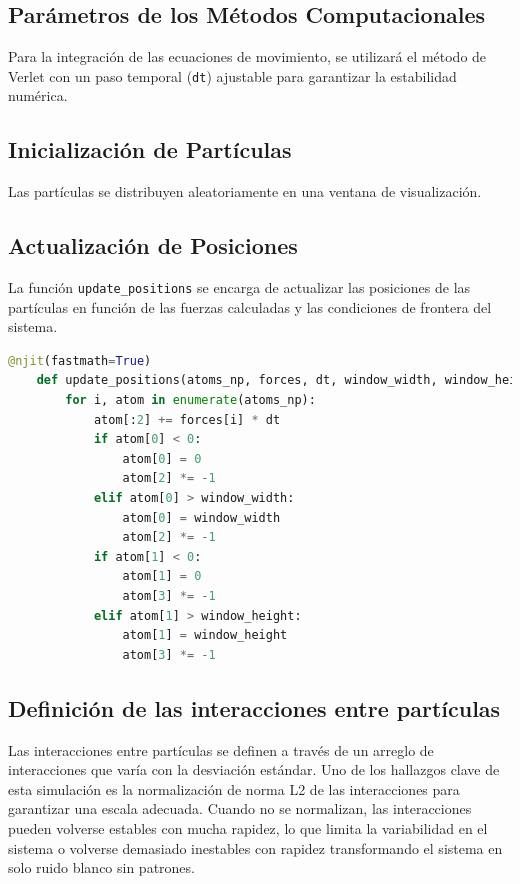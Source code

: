 \begin{itemize}
\subsection{Parámetros de los Métodos Computacionales}
Para la integración de las ecuaciones de movimiento, se utilizará el método de Verlet con un paso temporal (\texttt{dt}) ajustable para garantizar la estabilidad numérica.

\subsection{Inicialización de Partículas}
Las partículas se distribuyen aleatoriamente en una ventana de visualización.

\subsection{Actualización de Posiciones}
La función \texttt{update_positions} se encarga de actualizar las posiciones de las partículas en función de las fuerzas calculadas y las condiciones de frontera del sistema.

\begin{lstlisting}[language=Python]
    @njit(fastmath=True)
    def update_positions(atoms_np, forces, dt, window_width, window_height):
        for i, atom in enumerate(atoms_np):
            atom[:2] += forces[i] * dt
            if atom[0] < 0:
                atom[0] = 0
                atom[2] *= -1
            elif atom[0] > window_width:
                atom[0] = window_width
                atom[2] *= -1
            if atom[1] < 0:
                atom[1] = 0
                atom[3] *= -1
            elif atom[1] > window_height:
                atom[1] = window_height
                atom[3] *= -1
\end{lstlisting}

\subsection{Definición de las interacciones entre partículas}
Las interacciones entre partículas se definen a través de un arreglo de interacciones que varía con la desviación estándar. Uno de los hallazgos clave de esta simulación es la normalización de norma L2 de las interacciones para garantizar una escala adecuada. Cuando no se normalizan, las interacciones pueden volverse estables con mucha rapidez, lo que limita la variabilidad en el sistema o volverse demasiado inestables con rapidez transformando el sistema en solo ruido blanco sin patrones.


\end{itemize}
